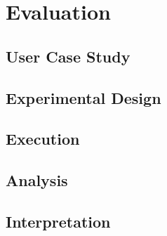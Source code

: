 
\chapter{Evaluation}

\ifpdf
    \graphicspath{{Chapters/Evaluation/Figs/}{Chapters/Evaluation/Figs/}{Chapters/Evaluation/Figs/}}
\else
    \graphicspath{{Chapters/Evaluation/Figs/}{Chapters/Evaluation/Figs/}}
\fi

\section{User Case Study}
\label{evaluation:section:casestudy}
\section{Experimental Design}
\label{evaluation:section:design}
\section{Execution}
\label{evaluation:section:execution}
\section{Analysis}
\label{evaluation:section:analysis}
\section{Interpretation}
\label{evaluation:section:interpretation}